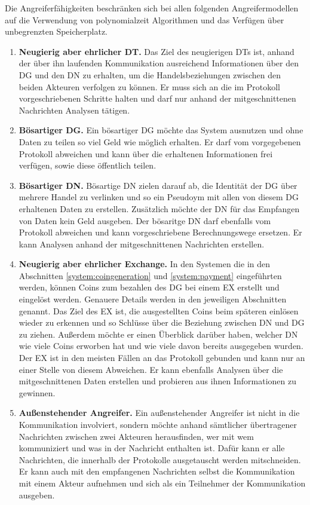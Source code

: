 \documentclass[
	fontsize=11pt,
	headings=small,
	parskip=half,           %
	bibliography=totoc,
	numbers=noenddot,       %
	open=any,               %
]{scrreprt}
\begin{document}
Die Angreiferfähigkeiten beschränken sich bei allen folgenden Angreifermodellen auf die Verwendung von polynomialzeit Algorithmen und das Verfügen über unbegrenzten Speicherplatz.
\begin{enumerate}
    \item \textbf{Neugierig aber ehrlicher DT.} Das Ziel des neugierigen DTs ist, anhand der über ihn laufenden Kommunikation ausreichend Informationen über den DG und den DN zu erhalten, um die Handelsbeziehungen zwischen den beiden Akteuren verfolgen zu können. Er muss sich an die im Protokoll vorgeschriebenen Schritte halten und darf nur anhand der mitgeschnittenen Nachrichten Analysen tätigen.
    \item \textbf{Bösartiger DG.} Ein bösartiger DG möchte das System ausnutzen und ohne Daten zu teilen so viel Geld wie möglich erhalten. Er darf vom vorgegebenen Protokoll abweichen und kann über die erhaltenen Informationen frei verfügen, sowie diese öffentlich teilen.
    \item \textbf{Bösartiger DN.} Bösartige DN zielen darauf ab, die Identität der DG über mehrere Handel zu verlinken und so ein Pseudoym mit allen von diesem DG erhaltenen Daten zu erstellen. Zusätzlich möchte der DN für das Empfangen von Daten kein Geld ausgeben. Der bösaritge DN darf ebenfalls vom Protokoll abweichen und kann vorgeschriebene Berechnungswege ersetzen. Er kann Analysen anhand der mitgeschnittenen Nachrichten erstellen.
    \item \textbf{Neugierig aber ehrlicher Exchange.} In den Systemen die in den Abschnitten \ref{system:coingeneration} und \ref{system:payment} eingeführten werden, können Coins zum bezahlen des DG bei einem EX erstellt und eingelöst werden. Genauere Details werden in den jeweiligen Abschnitten genannt. Das Ziel des EX ist, die ausgestellten Coins beim späteren einlösen wieder zu erkennen und so Schlüsse über die Beziehung zwischen DN und DG zu ziehen. Außerdem möchte er einen Überblick darüber haben, welcher DN wie viele Coins erworben hat und wie viele davon bereits ausgegeben wurden. Der EX ist in den meisten Fällen an das Protokoll gebunden und kann nur an einer Stelle von diesem Abweichen. Er kann ebenfalls Analysen über die mitgeschnittenen Daten erstellen und probieren aus ihnen Informationen zu gewinnen.
    \item \textbf{Außenstehender Angreifer.} Ein außenstehender Angreifer ist nicht in die Kommunikation involviert, sondern möchte anhand sämtlicher übertragener Nachrichten zwischen zwei Akteuren herausfinden, wer mit wem kommuniziert und was in der Nachricht enthalten ist. Dafür kann er alle Nachrichten, die innerhalb der Protokolle ausgetauscht werden mitschneiden. Er kann auch mit den empfangenen Nachrichten selbst die Kommunikation mit einem Akteur aufnehmen und sich als ein Teilnehmer der Kommunikation ausgeben.
\end{enumerate}
\end{document}
